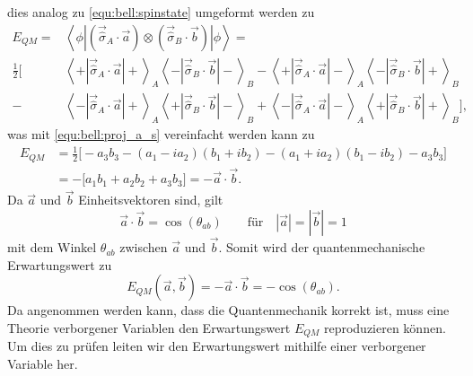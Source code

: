 \begin{refsection}
dies analog zu \eqref{equ:bell:spinstate} umgeformt werden zu
\begin{equation} 
\begin{split}
   E_{QM }=&\left\langle \phi \left| 
       \left( \vec{\hat{\sigma}}_A \cdot \vec{a} \right)
               \otimes \left( \vec{\hat{\sigma}}_B \cdot \vec{b} \right)
       \right| \phi \right\rangle
    = \\
    \frac{1}{2}\Bigg[ &
        \left\langle{+}\left| \vec{\hat{\sigma}}_A \cdot \vec{a} \right|{+}\right\rangle_A
        \left\langle{-}\left| \vec{\hat{\sigma}}_B \cdot \vec{b} \right|{-}\right\rangle_B
        -
        \left\langle{+}\left| \vec{\hat{\sigma}}_A \cdot \vec{a} \right|{-}\right\rangle_A
        \left\langle{-}\left| \vec{\hat{\sigma}}_B \cdot \vec{b} \right|{+}\right\rangle_B \\
        - &
        \left\langle{-}\left| \vec{\hat{\sigma}}_A \cdot \vec{a} \right|{+}\right\rangle_A
        \left\langle{+}\left| \vec{\hat{\sigma}}_B \cdot \vec{b} \right|{-}\right\rangle_B
        +
        \left\langle{-}\left| \vec{\hat{\sigma}}_A \cdot \vec{a} \right|{-}\right\rangle_A
        \left\langle{+}\left| \vec{\hat{\sigma}}_B \cdot \vec{b} \right|{+}\right\rangle_B
    \Bigg],
\end{split}
\end{equation}
was mit \eqref{equ:bell:proj_a_s} vereinfacht werden kann zu
\begin{equation}\label{equ:bell:e_qm}
\begin{split}
    E_{QM} &= \frac{1}{2} \big[ -a_3b_3 - (a_1-ia_2)(b_1+ib_2) - (a_1+ia_2)(b_1-ib_2) - a_3b_3 \big] \\
    &= -\big[ a_1b_1 + a_2b_2 + a_3b_3 \big] = -\vec{a} \cdot \vec{b}.
\end{split}
\end{equation}
Da $\vec{a}$ und $\vec{b}$ Einheitsvektoren sind, gilt
\begin{equation}
    \vec{a} \cdot \vec{b} = \cos(\theta_{ab}) \qquad \text{f\"ur} \quad |\vec{a}| = |\vec{b}| = 1
\end{equation}
mit dem Winkel $\theta_{ab}$ zwischen $\vec{a}$ und $\vec{b}$.
Somit wird der quantenmechanische Erwartungswert zu
\begin{equation}\label{equ:bell:res_qm}
    E_{QM}(\vec{a},\vec{b}) = -\vec{a}\cdot\vec{b} = -\cos(\theta_{ab}).
\end{equation}
Da angenommen werden kann, dass die Quantenmechanik korrekt ist, muss eine
Theorie verborgener Variablen den Erwartungswert $E_{QM}$ reproduzieren 
k\"onnen.
Um dies zu pr\"ufen leiten wir den Erwartungswert mithilfe einer verborgener
Variable her.


\end{refsection}
